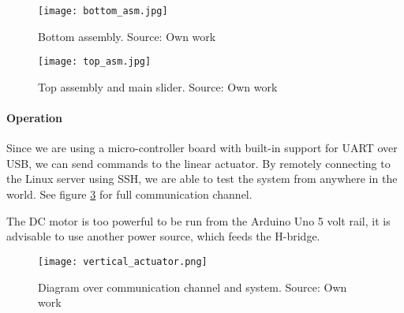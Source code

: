 \begin{figure}[ht]
    \centering
    \texttt{[image: bottom\_asm.jpg]}
    \caption{Bottom assembly. Source: Own work}
    \label{fig:bottom_asm}
\end{figure}

\begin{figure}[ht]
    \centering
    \texttt{[image: top\_asm.jpg]}
    \caption{Top assembly and main slider. Source: Own work}
    \label{fig:top_asm}
\end{figure}
\FloatBarrier

\paragraph{Operation}
Since we are using a micro-controller board with built-in support for UART over USB, we can send commands to the linear actuator. By remotely connecting to the Linux server using SSH, we are able to test the system from anywhere in the world. See figure \ref{fig:vertical_actuator} for full communication channel.

The DC motor is too powerful to be run from the Arduino Uno 5 volt rail, it is advisable to use another power source, which feeds the H-bridge.

\begin{figure}[ht]
    \centering
    \texttt{[image: vertical\_actuator.png]}
    \caption{Diagram over communication channel and system. Source: Own work}
    \label{fig:vertical_actuator}
\end{figure}
